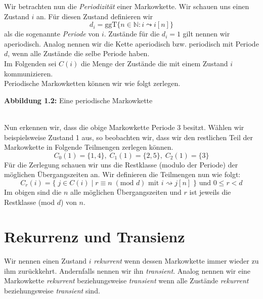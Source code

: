 \documentclass[a4paper]{article}
\begin{document}
Wir betrachten nun die \textit{Periodizität}  einer Markowkette.
Wir schauen uns einen Zustand $i$ an. Für diesen Zustand definieren wir
\[
d_i = \text{ggT} \{
	n \in \mathbb{N} : i \leadsto i[n]
\}
\] 
als die sogenannte \textit{Periode} von $i$.
Zustände für die $d_i = 1$ gilt nennen wir aperiodisch.
Analog nennen wir die Kette aperiodisch bzw. periodisch mit Periode $d$, wenn alle Zustände die selbe
Periode haben.
\\

Im Folgenden sei $C(i)$ die Menge der Zustände die mit einem Zustand $i$ kommunizieren.
\\

Periodische Markowketten können wir wie folgt zerlegen.

\begin{center}
\end{center}
\qquad \caption{\textbf{Abbildung 1.2:} Eine periodische Markowkette}
\\

Nun erkennen wir, dass die obige Markowkette Periode 3 besitzt.
Wählen wir beispielsweise Zustand 1 aus, so beobachten wir, dass wir den restlichen Teil der Markowkette
in Folgende Teilmengen zerlegen können.
\[
	C_0(1) = \{
		1, 4
	\}, \; C_1 (1) = \{
		2, 5
	\}, \; C_2 (1) = \{
		3
	\} 
\]
Für die Zerlegung schauen wir uns die Restklasse (modulo der Periode) der
möglichen Übergangszeiten an. Wir definieren die Teilmengen nun wie folgt:
\[
	C_r (i) = \{
		\;
		j \in C(i) \; | \; r \equiv n \; (\text{mod } d) \text{ mit } i \rightsquigarrow j [n]
		\;
	\}
	\text{ und } 0 \leq r < d
\] 
Im obigen sind die $n$ alle möglichen Übergangszeiten und $r$ ist jeweils die Restklasse (mod $d$)
von $n$.

\section{Rekurrenz und Transienz}
Wir nennen einen Zustand $i$ \textit{rekurrent} wenn dessen Markowkette immer wieder zu ihm zurückkehrt.
Andernfalls nennen wir ihn \textit{transient}.
Analog nennen wir eine Markowkette \textit{rekurrent} beziehungsweise \textit{transient} wenn alle Zustände
\textit{rekurrent} beziehungsweise \textit{transient} sind.
\\
\end{document}
